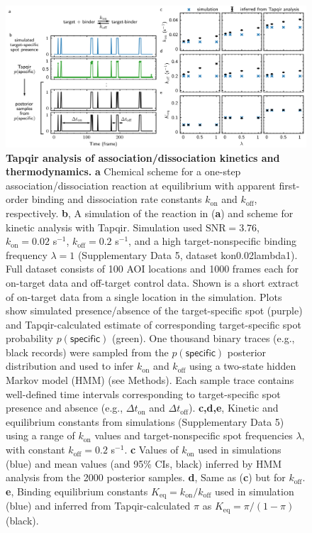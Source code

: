 \begin{figure}[h]
\centering
\includegraphics[width=\textwidth]{figures/figure6.png}
\caption{\textbf{Tapqir analysis of association/dissociation kinetics and thermodynamics.} \textbf{a} Chemical scheme for a one-step association/dissociation reaction at equilibrium with apparent first-order binding and dissociation rate constants $k_{\mathrm{on}}$ and $k_{\mathrm{off}}$, respectively. \textbf{b}, A simulation of the reaction in (\textbf{a}) and scheme for kinetic analysis with Tapqir. Simulation used $\mathrm{SNR} = 3.76$, $k_\mathrm{on} = 0.02$ s$^{-1}$, $k_\mathrm{off} = 0.2$ s$^{-1}$, and a high target-nonspecific binding frequency $\lambda = 1$ (Supplementary Data 5, dataset kon0.02lambda1). Full dataset consists of 100 AOI locations and 1000 frames each for on-target data and off-target control data. Shown is a short extract of on-target data from a single location in the simulation.  Plots show simulated presence/absence of the target-specific spot (purple) and Tapqir-calculated estimate of corresponding target-specific spot probability $p(\mathsf{specific})$ (green). One thousand binary traces (e.g., black records) were sampled from the $p(\mathsf{specific})$ posterior distribution and used to infer $k_\mathrm{on}$ and $k_\mathrm{off}$ using a two-state hidden Markov model (HMM) (see Methods). Each sample trace contains well-defined time intervals corresponding to target-specific spot presence and absence (e.g., $\Delta t_\mathrm{on}$ and $\Delta t_\mathrm{off}$). \textbf{c,d,e}, Kinetic and equilibrium constants from simulations (Supplementary Data 5) using a range of $k_\mathrm{on}$ values and  target-nonspecific spot frequencies $\lambda$, with constant $k_\mathrm{off} = 0.2$ s$^{-1}$. \textbf{c} Values of $k_{\mathrm{on}}$ used in simulations (blue) and mean values (and 95\% CIs, black) inferred by HMM analysis from the 2000 posterior samples. \textbf{d}, Same as (\textbf{c}) but for $k_{\mathrm{off}}$. \textbf{e},  Binding equilibrium constants $K_{\mathrm{eq}} = k_{\mathrm{on}} / k_{\mathrm{off}}$ used in simulation (blue) and inferred from Tapqir-calculated $\pi$ as $K_{\mathrm{eq}} = \pi / (1 - \pi)$ (black). }
\label{fig:kinetic_analysis}
\end{figure}
\clearpage
\pagebreak

